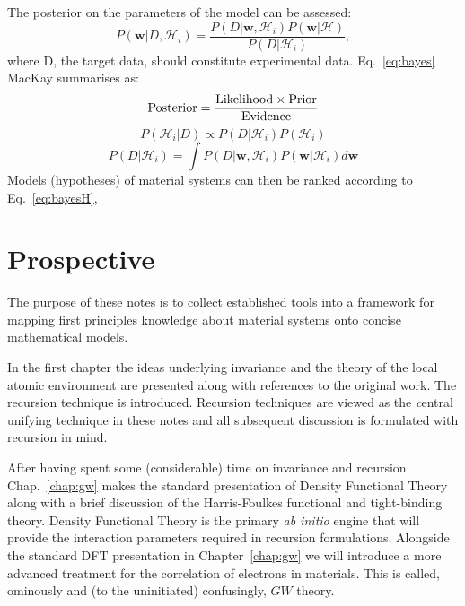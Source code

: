 The posterior on the parameters of the model can be assessed:
%
\begin{equation}
\label{eq:bayes}
P(\mathbf{w}|D, \mathcal{H}_{i}) = 
\frac{P(D|\mathbf{w}, \mathcal{H}_{i})P(\mathbf{w}|\mathcal{H})}{P(D|\mathcal{H}_{i})},
\end{equation}
%
where D, the target data, should constitute experimental data. 
Eq.~\ref{eq:bayes} MacKay summarises as:
%
\begin{equation}
{\rm Posterior} = \frac{{\rm Likelihood} \times {\rm Prior}}{{\rm Evidence}}
\end{equation}
%
\begin{equation}
\label{eq:bayesH}
P(\mathcal{H}_{i}|D) \propto P(D|\mathcal{H}_{i})P(\mathcal{H}_{i})
\end{equation}
%
\begin{equation}
\label{eq:bayesH}
P(D|\mathcal{H}_{i}) = \int P(D|\mathbf{w}, \mathcal{H}_{i})P(\mathbf{w}|\mathcal{H}_{i})d\mathbf{w}
\end{equation}
%
Models (hypotheses) of material systems can then be ranked according to Eq.~\ref{eq:bayesH},  

\section{Prospective}
The purpose of these notes is to collect established tools into 
a framework for mapping first principles knowledge about material systems 
onto concise mathematical models. 

In the first chapter the ideas underlying invariance and the 
theory of the local atomic environment are presented along with references
to the original work. The recursion technique is introduced. 
Recursion techniques are viewed as the {\emph central unifying technique} in these
notes and all subsequent discussion is formulated with recursion in mind.

After having spent some (considerable) time on invariance and recursion
Chap.~\ref{chap:gw} makes the standard presentation of Density Functional Theory along 
with a brief discussion of the Harris-Foulkes functional and tight-binding theory. 
Density Functional Theory is the primary {\it ab initio} engine that will 
provide the interaction parameters required in recursion formulations.
Alongside the standard DFT presentation in Chapter~\ref{chap:gw} we will
introduce a more advanced treatment for the correlation of electrons in materials.
This is called, ominously and (to the uninitiated) confusingly, $GW$ theory.

